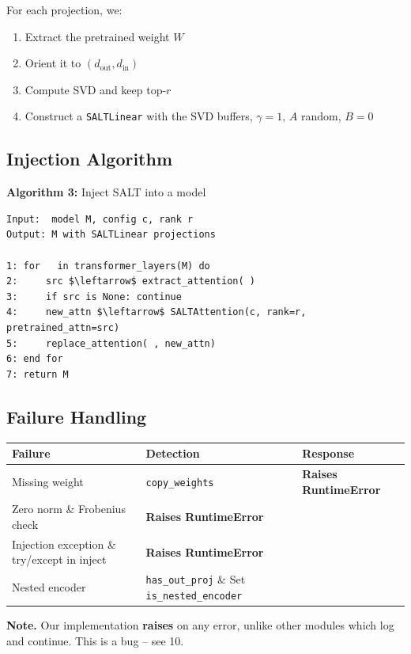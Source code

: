 For each projection, we:

\begin{enumerate}
\item Extract the pretrained weight $W$
\item Orient it to $(d_\text{out}, d_\text{in})$
\item Compute SVD and keep top-$r$
\item Construct a \texttt{SALTLinear} with the SVD buffers, $\gamma = 1$, $A$ random,
  $B = 0$

\end{enumerate}
\subsection{Injection Algorithm}

\textbf{Algorithm 3:} Inject SALT into a model
\begin{lstlisting}
Input:  model M, config c, rank r
Output: M with SALTLinear projections

1: for   in transformer_layers(M) do
2:     src $\leftarrow$ extract_attention( )
3:     if src is None: continue
4:     new_attn $\leftarrow$ SALTAttention(c, rank=r, pretrained_attn=src)
5:     replace_attention( , new_attn)
6: end for
7: return M
\end{lstlisting}

\subsection{Failure Handling}

\begin{table}[H]
\centering
\small
\begin{tabular}{lll}
\toprule
\textbf{Failure} & \textbf{Detection} & \textbf{Response} \\
\midrule
Missing weight & \texttt{copy\_weights} & \textbf{Raises RuntimeError} \\
Zero norm \& Frobenius check & \textbf{Raises RuntimeError} \\
Injection exception \& try/except in inject & \textbf{Raises RuntimeError} \\
Nested encoder & \texttt{has\_out\_proj} \& Set \texttt{is\_nested\_encoder} \\
\bottomrule
\end{tabular}
\end{table}

\textbf{Note.} Our implementation \textbf{raises} on any error, unlike other modules 
which log and continue. This is a bug -- see  10.


